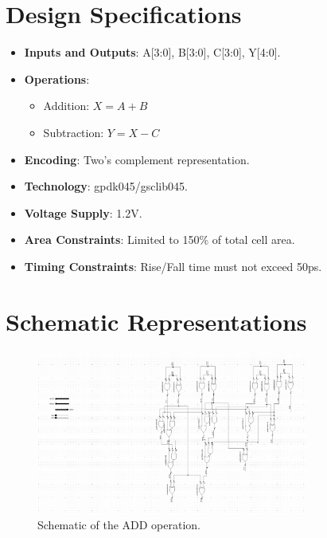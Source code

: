 \documentclass[a4paper,12pt]{article}
\begin{document}
\section{Design Specifications}
\begin{itemize}
    \item \textbf{Inputs and Outputs}: A[3:0], B[3:0], C[3:0], Y[4:0].
    \item \textbf{Operations}:
    \begin{itemize}
        \item Addition: $X = A + B$
        \item Subtraction: $Y = X - C$
    \end{itemize}
    \item \textbf{Encoding}: Two’s complement representation.
    \item \textbf{Technology}: gpdk045/gsclib045.
    \item \textbf{Voltage Supply}: 1.2V.
    \item \textbf{Area Constraints}: Limited to 150\% of total cell area.
    \item \textbf{Timing Constraints}: Rise/Fall time must not exceed 50ps.
\end{itemize}
\section{Schematic Representations}
\begin{figure}[H]
    \centering
    \includegraphics[width=0.8\textwidth]{images/ADD_schematic}
    \caption{Schematic of the ADD operation.}
\end{figure}
\end{document}
